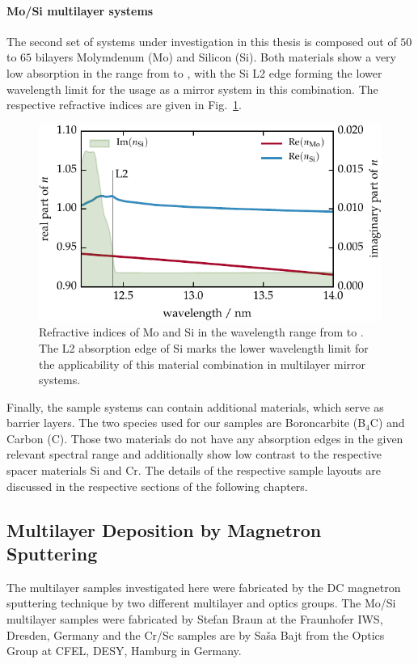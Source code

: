 \paragraph{Mo/Si multilayer systems}
The second set of systems under investigation in this thesis is composed out of $50$ to $65$ bilayers Molymdenum (Mo) and Silicon (Si). Both materials show a very low absorption in the range from  to , with the Si L2 edge forming the lower wavelength limit for the usage as a mirror system in this combination. The respective refractive indices are given in Fig.~\ref{ch_exp:fig_mosi_contrast}.
\begin{figure}[htb]
        \includegraphics{img/Mo_Si_contrast}
        \caption[Refractive indices of Mo and Si in the wavelength range from  to .]{%
            Refractive indices of Mo and Si in the wavelength range from  to . The L2 absorption edge of Si marks the lower wavelength limit for the applicability of this material combination in multilayer mirror systems.}
        \label{ch_exp:fig_mosi_contrast}
\end{figure}

Finally, the sample systems can contain additional materials, which serve as barrier layers. The two species used for our samples are Boroncarbite (B$_4$C) and Carbon (C). Those two materials do not have any absorption edges in the given relevant spectral range and additionally show low contrast to the respective spacer materials Si and Cr. The details of the respective sample layouts are discussed in the respective sections of the following chapters.

\subsection{Multilayer Deposition by Magnetron Sputtering} \label{ch_exp:sec_magnetron_sputtering}
The multilayer samples investigated here were fabricated by the DC magnetron sputtering technique \cite{stearns_fabrication_1991} by two different multilayer and optics groups. The Mo/Si multilayer samples were fabricated by Stefan Braun at the Fraunhofer IWS, Dresden, Germany and the Cr/Sc samples are by Sa\v{s}a Bajt from the Optics Group at CFEL, DESY, Hamburg in Germany.

